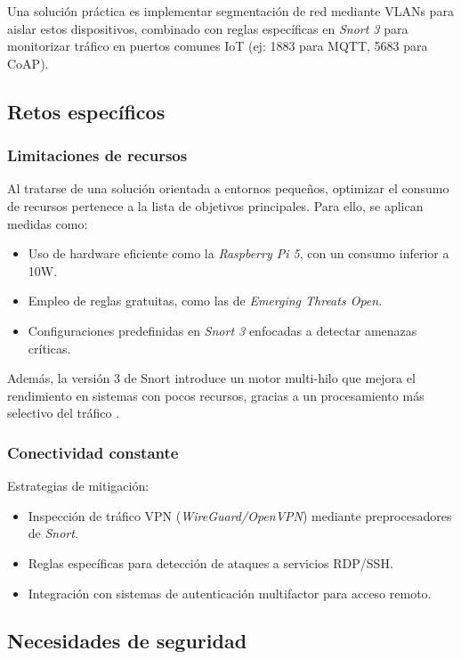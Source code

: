\documentclass[11pt,a4paper,twoside]{report}
\begin{document}
Una solución práctica es implementar segmentación de red mediante VLANs para aislar estos dispositivos, combinado con reglas específicas en \textit{Snort 3} para monitorizar tráfico en puertos comunes IoT (ej: 1883 para MQTT, 5683 para CoAP).

\subsection{Retos específicos}

\subsubsection{Limitaciones de recursos}

Al tratarse de una solución orientada a entornos pequeños, optimizar el consumo de recursos pertenece a la lista de objetivos principales. Para ello, se aplican medidas como:

\begin{itemize}
	\item Uso de hardware eficiente como la \textit{Raspberry Pi 5}, con un consumo inferior a 10W.
	\item Empleo de reglas gratuitas, como las de \textit{Emerging Threats Open}.
	\item Configuraciones predefinidas en \textit{Snort 3} enfocadas a detectar amenazas críticas.
\end{itemize}

Además, la versión 3 de Snort introduce un motor multi-hilo que mejora el rendimiento en sistemas con pocos recursos, gracias a un procesamiento más selectivo del tráfico \cite{park2017performance}.


\subsubsection{Conectividad constante}
Estrategias de mitigación:
\begin{itemize}
	\item Inspección de tráfico VPN (\textit{WireGuard/OpenVPN}) mediante preprocesadores de \textit{Snort}.
	\item Reglas específicas para detección de ataques a servicios RDP/SSH.
	\item Integración con sistemas de autenticación multifactor para acceso remoto.
\end{itemize}

\subsection{Necesidades de seguridad}
\end{document}
